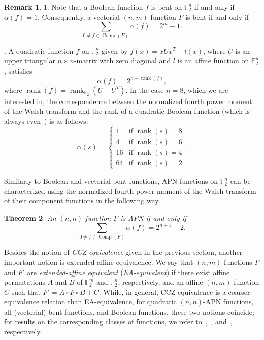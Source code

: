 \documentclass{amsart}[11pt]
\theoremstyle{plain}
\newtheorem{theorem}{Theorem}[section]
\theoremstyle{definition}
\newtheorem{remark}[theorem]{Remark}
\numberwithin{theorem}{section}
\numberwithin{equation}{section}
\numberwithin{table}{section}
\numberwithin{figure}{section}
\numberwithin{algorithm}{section}
\def\F{\mathbb F}
\begin{document}
\begin{remark}
   1.  Note that a Boolean function $f$ is bent on $\F_2^n$ if and only if $\alpha(f) = 1$. Consequently, a vectorial $(n,m)$-function $F$ is bent if and only if 
    \begin{equation}\label{eq:bent_alpha}
    	\sum_{0\neq f \in \operatorname{Comp}(F) } \alpha(f) = 2^m - 1.
    \end{equation} 
    
   . A quadratic function $f$ on $\F_2^n$ given by $f(x)=xUx^T+l(x)$, where $U$ is an upper triangular $n\times n$-matrix with zero diagonal and $l$ is an affine function on $\F_2^n$,  satisfies $$\alpha(f)=2^{n-\operatorname{rank}(f)},$$ where $\operatorname{rank}(f)=\operatorname{rank}_{\F_2}(U+U^T)$. In the case $n=8$, which we are interested in, the correspondence between the normalized fourth power moment of the Walsh transform and the rank of a quadratic Boolean function (which is always even~\cite[Chapter 15]{MacWilliamsSloane}) is as follows:
    $$\alpha(s) = 
		\begin{cases}
			1 &\mbox{if } \operatorname{rank}(s)=8 \\
			4 &\mbox{if } \operatorname{rank}(s)=6 \\
			16 &\mbox{if } \operatorname{rank}(s)=4 \\
			64 &\mbox{if } \operatorname{rank}(s)=2
		\end{cases}.$$
\end{remark}

Similarly to Boolean and vectorial bent functions, APN functions on $\F_2^n$ can be characterized using the normalized fourth power moment of the Walsh transform of their component functions in the following way.

\begin{theorem}\cite[Corollary 1]{berger2006almost}
	An $(n, n)$-function $F$ is APN if and only if 
	\begin{equation}\label{eq:APN_alpha}
		\sum_{0\neq f \in \operatorname{Comp}(F) } \alpha(f) = 2^{n+1} - 2.
	\end{equation}
\end{theorem}	

Besides the notion of \emph{CCZ-equivalence} given in the previous section, another important notion is extended-affine equivalence. We say that $(n,m)$-functions $F$ and $F'$ are \emph{extended-affine equivalent} (\emph{EA-equivalent}) if there exist affine permutations $A$ and $B$ of $\F_2^m$ and $\F_2^n$, respectively, and an affine $(n,m)$-function $C$ such that $F' = A \circ F \circ B + C$. While, in general, CCZ-equivalence is a coarser equivalence relation than EA-equivalence, for quadratic $(n,n)$-APN functions, all (vectorial) bent functions, and Boolean functions, these two notions coincide; for results on the corresponding classes of functions, we refer to~\cite{yoshiara2008dimensional},~\cite{KyureghyanP08}, and~\cite{BudaghyanC2010}, respectively.
\end{document}
